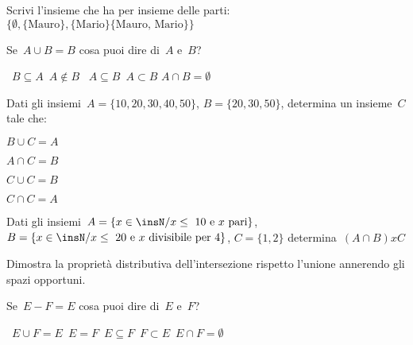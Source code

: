 \begin{esercizio}
\label{ese:7.74}
Scrivi l'insieme che ha per insieme delle parti:
\(\{\emptyset,\{\text{Mauro}\},\{\text{Mario}\}\{\text{Mauro, Mario}\}\}\)
\end{esercizio}

\begin{esercizio}
\label{ese:7.75}
Se~\(A\cup B=B\) cosa puoi dire di~\(A\) e~\(B\)?
\begin{center}
 \boxA\quad~\(B\subseteq A\)\quad\boxB\quad~\(A\notin B\)\quad
 \boxC\quad~\(A\subseteq B\)\quad\boxD\quad~\(A\subset B\)\quad
 \boxE\quad\(A\cap B=\emptyset \)
\end{center}
\end{esercizio}

\begin{esercizio}
\label{ese:7.76}
Dati gli insiemi~\(A=\{10, 20, 30, 40, 50\}\), \(B=\{20, 30, 50\}\),
determina un insieme~\(C\) tale che:
\begin{multicols}{4}
\begin{enumeratea}
 \item \(B\cup C=A\)
 \item \(A\cap C=B\)
 \item \(C\cup C=B\)
 \item \(C\cap C=A\)
\end{enumeratea}
\end{multicols}
\end{esercizio}

\begin{esercizio}
\label{ese:7.77}
Dati gli insiemi~\(A=\{x\in\insN/x\le~10\text{ e }x\text{ pari}\}\),
\(B=\{x\in\insN/x\le~20\text{ e }x\text{ divisibile per }4\}\),
\(C=\{1,2\}\) determina~\((A\cap B)xC\)
\end{esercizio}

\begin{esercizio}
\label{ese:7.78}
Dimostra la proprietà distributiva dell'intersezione rispetto l'unione annerendo 
gli spazi opportuni.
\begin{center}
 
\end{center}
\vspace{-12pt}
\end{esercizio}


\begin{esercizio}
\label{ese:7.79}
Se~\(E-F=E\) cosa puoi dire di~\(E\) e~\(F\)?
\begin{center}
 \boxA\quad~\(E\cup F=E\)\quad\boxB\quad~\(E=F\)\quad\boxC\quad~\(E\subseteq 
F\)\quad\boxD\quad~\(F\subset E\)\quad\boxE\quad~\(E\cap F=\emptyset \)
\end{center}
\end{esercizio}

